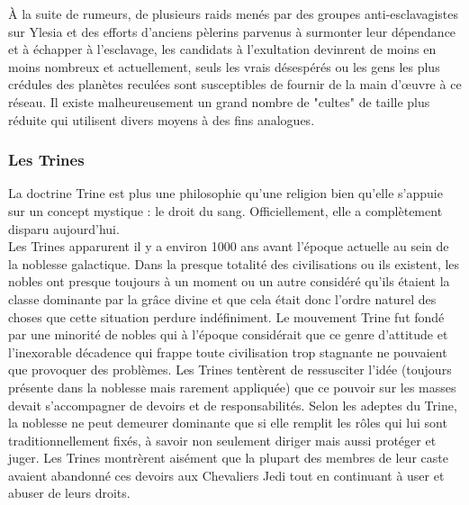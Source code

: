 \documentclass[twoside]{article}
\begin{document}
À la suite de rumeurs, de plusieurs raids menés par des groupes anti-esclavagistes sur Ylesia et des efforts d'anciens pèlerins parvenus à surmonter leur dépendance et à échapper à l'esclavage, les candidats à l'exultation devinrent de moins en moins nombreux et actuellement, seuls les vrais désespérés ou les gens les plus crédules des planètes reculées sont susceptibles de fournir de la main d'œuvre à ce réseau. Il existe malheureusement un grand nombre de "cultes" de taille plus réduite qui utilisent divers moyens à des fins analogues.

\subsubsection{Les Trines}
La doctrine Trine est plus une philosophie qu'une religion bien qu'elle s'appuie sur un concept mystique : le droit du sang. Officiellement, elle a complètement disparu aujourd'hui.\\

Les Trines apparurent il y a environ 1000 ans avant l'époque actuelle au sein de la noblesse galactique. Dans la presque totalité des civilisations ou ils existent, les nobles ont presque toujours à un moment ou un autre considéré qu'ils étaient la classe dominante par la grâce divine et que cela était donc l'ordre naturel des choses que cette situation perdure indéfiniment. Le mouvement Trine fut fondé par une minorité de nobles qui à l'époque considérait que ce genre d'attitude et l'inexorable décadence qui frappe toute civilisation trop stagnante ne pouvaient que provoquer des problèmes. Les Trines tentèrent de ressusciter l'idée (toujours présente dans la noblesse mais rarement appliquée) que ce pouvoir sur les masses devait s'accompagner de devoirs et de responsabilités. Selon les adeptes du Trine, la noblesse ne peut demeurer dominante que si elle remplit les rôles qui lui sont traditionnellement fixés, à savoir non seulement diriger mais aussi protéger et juger. Les Trines montrèrent aisément que la plupart des membres de leur caste avaient abandonné ces devoirs aux Chevaliers Jedi tout en continuant à user et abuser de leurs droits.\\
\end{document}
